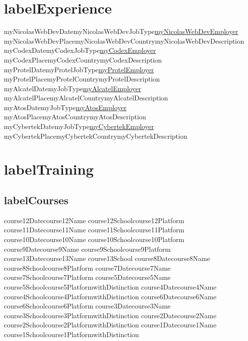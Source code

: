 \documentclass[11pt,a4paper]{moderncv}
\begin{document}
\section{labelExperience}
\cventry%
    {myNicolasWebDevDate}{myNicolasWebDevJobType}{\href{myNicolasWebDevWebsite}{myNicolasWebDevEmployer}}
    {myNicolasWebDevPlace}{myNicolasWebDevCountry}{myNicolasWebDevDescription}
\cventry%
    {myCodexDate}{myCodexJobType}{\href{myCodexWebsite}{myCodexEmployer}}
    {myCodexPlace}{myCodexCountry}{myCodexDescription}
\cventry%
    {myProtelDate}{myProtelJobType}{\href{myProtelWebsite}{myProtelEmployer}}
    {myProtelPlace}{myProtelCountry}{myProtelDescription}
\cventry%
    {myAlcatelDate}{myJobType}{\href{myAlcatelWebsite}{myAlcatelEmployer}}
    {myAlcatelPlace}{myAlcatelCountry}{myAlcatelDescription}
\cventry%
    {myAtosDate}{myJobType}{\href{myAtosWebsite}{myAtosEmployer}}
    {myAtosPlace}{myAtosCountry}{myAtosDescription}
\cventry%
    {myCybertekDate}{myJobType}{\href{myCybertekWebsite}{myCybertekEmployer}}
    {myCybertekPlace}{myCybertekCountry}{myCybertekDescription}

\newcommand\bookentry[3]{
    \cventry{}{#1}{#2}{#3}{}{}
}

\section{labelTraining}
\subsection{labelCourses}
\cventry%
    {course12Date}{course12Name}
    {course12School}{course12Platform}{}{}
\cventry%
    {course11Date}{course11Name}
    {course11School}{course11Platform}{}{}
\cventry%
    {course10Date}{course10Name}
    {course10School}{course10Platform}{}{}
\cventry%
    {course9Date}{course9Name}
    {course9School}{course9Platform}{}{}
\cventry%
    {course13Date}{course13Name}
    {course13School}{}{}{}
\cventry%
    {course8Date}{course8Name}
    {course8School}{course8Platform}{}{}
\cventry%
    {course7Date}{course7Name}
    {course7School}{course7Platform}{}{}
\cventry%
    {course5Date}{course5Name}
    {course5School}{course5Platform}{}{withDistinction}
\cventry%
    {course4Date}{course4Name}
    {course4School}{course4Platform}{}{withDistinction}
\cventry%
    {course6Date}{course6Name}
    {course6School}{course6Platform}{}{}
\cventry%
    {course3Date}{course3Name}
    {course3School}{course3Platform}{}{withDistinction}
\cventry%
    {course2Date}{course2Name}
    {course2School}{course2Platform}{}{withDistinction}
\cventry%
    {course1Date}{course1Name}
    {course1School}{course1Platform}{}{withDistinction}
\end{document}
